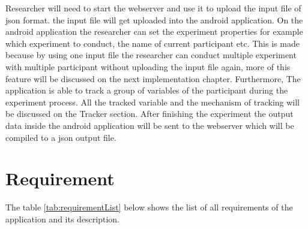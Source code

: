 Researcher will need to start the webserver and use it to upload the input file of json format. the input file will get uploaded into the android application.  On the android application the researcher can set the experiment properties for example which experiment to conduct, the name of current participant etc. This is made because by using one input file the researcher can conduct multiple experiment with multiple participant without uploading the input file again, more of this feature will be discussed on the next implementation chapter. Furthermore, The application is able to track a group of variables of the participant during the experiment process. All the tracked variable and the mechanism of tracking will be discussed on the Tracker section. After finishing the experiment the output data inside the android application will be sent to the webserver which will be compiled to a json output file.

\section{Requirement}

The table \ref{tab:requirementList} below shows the list of all requirements of the application and its description.

